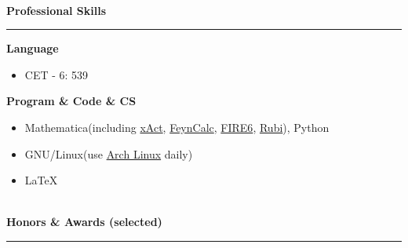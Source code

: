 \documentclass[12pt]{article}
\renewcommand*{\section}[1]{
    ~\\ \noindent \textbf{#1} \medskip \hrule \medskip
}
\begin{document}

\section{Professional Skills}

\textbf{Language}
\begin{itemize}[noitemsep,nolistsep]
    \item CET - 6: 539
\end{itemize}

\textbf{Program \& Code \& CS}
\begin{itemize}[noitemsep,nolistsep]
    \item Mathematica(including \href{http://xact.es/index.html}{xAct}, \href{https://feyncalc.github.io/}{FeynCalc}, \href{https://arxiv.org/abs/1901.07808}{FIRE6}, \href{https://rulebasedintegration.org/}{Rubi}), Python
    \item GNU/Linux(use \href{https://archlinux.org/}{Arch Linux} daily)
    \item \LaTeX
\end{itemize}


\section{Honors \& Awards (selected)}
\end{document}
